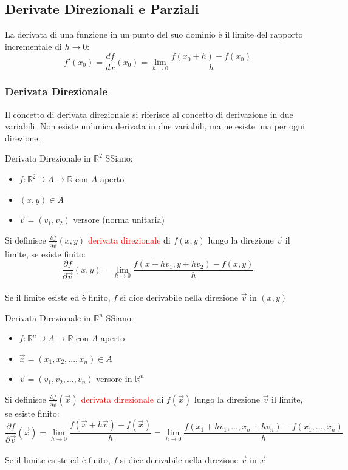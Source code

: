 \documentclass{article}  %
\begin{document}
\subsection{Derivate Direzionali e Parziali}
\begin{osservazioni}
	La derivata di una funzione in un punto del suo dominio è il limite del rapporto incrementale di $h \to 0$:
	\[
		f'(x_0)=\frac{df}{dx}(x_0)=\lim_{h \to 0}\frac{f(x_0+h)-f(x_0)}{h}
	\]
\end{osservazioni}
\subsubsection{Derivata Direzionale}
Il concetto di derivata direzionale si riferisce al concetto di derivazione in due variabili. Non esiste un'unica derivata in due variabili, ma ne esiste una per ogni direzione.
\begin{definition}{Derivata Direzionale in $\mathbb{R}^2$}
	SSiano: \begin{itemize}
		\item $f: \mathbb{R}^2 \supseteq A \to \mathbb{R}$ con $A$ aperto
		\item $(x,y) \in A$
		\item $\vec{v} = (v_1, v_2)$ versore (norma unitaria)
	\end{itemize}
	Si definisce $\frac{\partial f}{\partial \vec{v}}(x,y)$ \textcolor{red}{derivata direzionale} di $f(x,y)$ lungo la direzione $\vec{v}$ il limite, se esiste finito:
	\[
		\frac{\partial f}{\partial \vec{v}}(x,y)=\lim_{h \to 0}\frac{f(x+hv_1,y+hv_2)-f(x,y)}{h}
	\]
	\\ Se il limite esiste ed è finito, $f$ si dice derivabile nella direzione $\vec{v}$ in $(x,y)$
\end{definition}
\begin{definition}{Derivata Direzionale in $\mathbb{R}^n$}
	SSiano: \begin{itemize}
		\item $f: \mathbb{R}^n \supseteq A \to \mathbb{R}$ con $A$ aperto
		\item $\vec{x}=(x_1,x_2,...,x_n) \in A$
		\item $\vec{v} = (v_1, v_2,...,v_n)$ versore in $\mathbb{R}^n$
	\end{itemize}
	Si definisce $\frac{\partial f}{\partial \vec{v}}(\vec{x})$ \textcolor{red}{derivata direzionale} di $f(\vec{x})$ lungo la direzione $\vec{v}$ il limite, se esiste finito:
	\[
		\frac{\partial f}{\partial \vec{v}}(\vec{x})=\lim_{h \to 0}\frac{f(\vec{x}+h\vec{v})-f(\vec{x})}{h}=\lim_{h \to 0}\frac{f(x_1+hv_1,...,x_n+hv_n)-f(x_1,...,x_n)}{h}
	\]
	\\
	Se il limite esiste ed è finito, $f$ si dice derivabile nella direzione $\vec{v}$ in $\vec{x}$
\end{definition}
\end{document}
